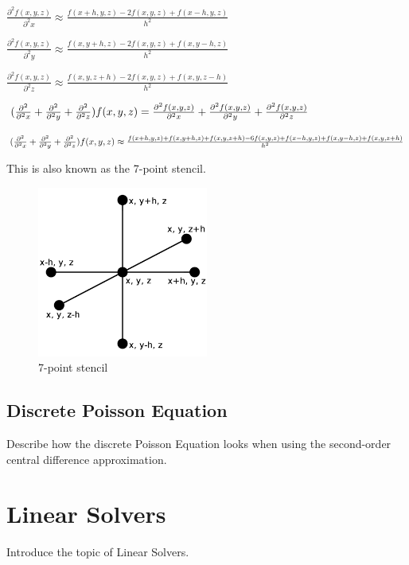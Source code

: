 $\frac{\partial^2 f(x, y, z)}{\partial^2 x} \approx \frac{f(x+h, y, z) - 2f(x, y, z) + f(x-h, y, z)}{h^2}$

$\frac{\partial^2 f(x, y, z)}{\partial^2 y} \approx \frac{f(x, y+h, z) - 2f(x, y, z) + f(x, y-h, z)}{h^2}$

$\frac{\partial^2 f(x, y, z)}{\partial^2 z} \approx \frac{f(x, y, z+h) - 2f(x, y, z) + f(x, y, z-h)}{h^2}$

$(\frac{\partial^2}{\partial^2 x} + \frac{\partial^2}{\partial^2 y} + \frac{\partial^2}{\partial^2 z}) f (x, y, z) = \frac{\partial^2 f(x, y, z)}{\partial^2 x} 
+ \frac{\partial^2 f(x, y, z)}{\partial^2 y} + \frac{\partial^2 f(x, y, z)}{\partial^2 z}$

$(\frac{\partial^2}{\partial^2 x} + \frac{\partial^2}{\partial^2 y} + \frac{\partial^2}{\partial^2 z}) f (x, y, z) \approx \frac{f(x+h, y, z) + f(x, y+h, z) + f(x, y, z+h) 
- 6f(x, y, z) + f(x-h, y, z) + f(x, y-h, z) + f(x, y, z+h)}{h^2}$

This is also known as the 7-point stencil.

\begin{figure}[h]
	\center
	\includegraphics[width=0.5\textwidth]{images/7_point_stencil}
	\caption{7-point stencil}
\end{figure}


\subsection*{Discrete Poisson Equation}

Describe how the discrete Poisson Equation looks when using the second-order central difference approximation.

\section*{Linear Solvers}

Introduce the topic of Linear Solvers.

